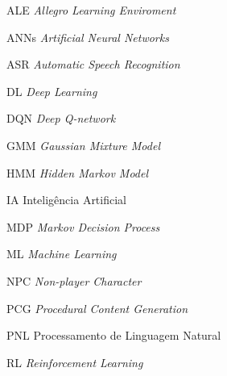 \begin{siglas}
 \item[ALE] \textit{Allegro Learning Enviroment}
 \item[ANNs] \textit{Artificial Neural Networks}
 \item[ASR] \textit{Automatic Speech Recognition}
 \item[DL] \textit{Deep Learning}
 \item[DQN] \textit{Deep Q-network}
 \item[GMM] \textit{Gaussian Mixture Model}
 \item[HMM] \textit{Hidden Markov Model}
 \item[IA] Inteligência Artificial
 \item[MDP] \textit{Markov Decision Process}
 \item[ML] \textit{Machine Learning}
 \item[NPC] \textit{Non-player Character}
 \item[PCG] \textit{Procedural Content Generation}
 \item[PNL] Processamento de Linguagem Natural
 \item[RL] \textit{Reinforcement Learning}
\end{siglas}
